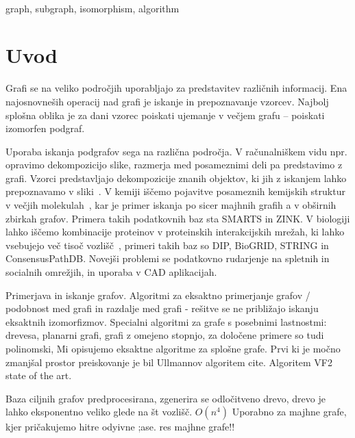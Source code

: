\documentclass[a4paper, 12pt, ]{book}
\newcommand{\TODO}[1]{\textcolor{red}{#1}}
\newcommand{\clearemptydoublepage}{\newpage{\pagestyle{empty}\cleardoublepage}}
\begin{document}
	\vspace{2cm}
	\\
	graph, subgraph, isomorphism, algorithm
	
	\clearemptydoublepage




\mainmatter
\setcounter{page}{1}
\pagestyle{fancy}



\chapter{Uvod}
Grafi se na veliko področjih uporabljajo za predstavitev različnih informacij. Ena najosnovneših 
operacij nad grafi je iskanje in prepoznavanje vzorcev. Najbolj splošna oblika je za dani vzorec poiskati
ujemanje v večjem grafu -- poiskati izomorfen podgraf. 

Uporaba iskanja podgrafov sega na različna področja. V računalniškem vidu npr. opravimo 
dekompozicijo slike, razmerja med posameznimi deli pa predstavimo z grafi. Vzorci predstavljajo
dekompozicije znanih objektov, ki jih z iskanjem lahko prepoznavamo v sliki~\cite{vf2}. V kemiji iščemo
pojavitve posameznih kemijskih struktur v večjih molekulah~\cite{chem}, kar je primer iskanja po sicer
majhnih grafih a v obširnih zbirkah grafov. Primera takih podatkovnih baz sta SMARTS in ZINK. V
biologiji lahko iščemo kombinacije proteinov v proteinskih interakcijskih mrežah, ki lahko vsebujejo več
tisoč vozlišč~\cite{subsea}, primeri takih baz so DIP, BioGRID, STRING in ConsensusPathDB. Novejši
problemi se podatkovno rudarjenje na spletnih in socialnih omrežjih, in uporaba v CAD aplikacijah.

 

  Primerjava in iskanje grafov. Algoritmi za eksaktno primerjanje grafov / podobnost med grafi in razdalje med grafi - rešitve se ne približajo iskanju eksaktnih izomorfizmov. Specialni algoritmi za grafe s posebnimi lastnostmi: drevesa, planarni grafi, grafi z
omejeno stopnjo, za določene primere so tudi polinomski, Mi opisujemo eksaktne algoritme za splošne grafe. 
Prvi ki je močno zmanjšal prostor preiskovanje je bil Ullmannov algoritem cite. Algoritem VF2 state of the art.

%	

\cite{poly} Baza ciljnih grafov predprocesirana, zgenerira se odločitveno drevo, drevo je lahko eksponentno veliko glede na št vozlišč. $O(n^4)$ Uporabno za majhne grafe, kjer pričakujemo hitre odyivne ;ase. res majhne grafe!!
\end{document}
